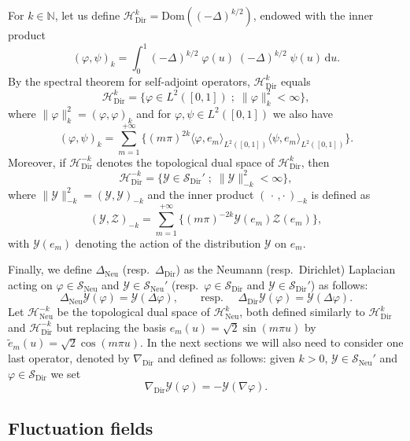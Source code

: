 \documentclass[10pt]{amsart}
\theoremstyle{definition}\newtheorem{defi}[theo]{Definition}\newtheorem{rema}[theo]{Remark}\newtheorem{exam}[theo]{Example}\newtheorem{exem}[theo]{Example}\newtheorem{nota}[theo]{Notation}
\DeclareMathOperator{\Dir}{Dir}
\DeclareMathOperator{\Neu}{Neu}
\newcommand{\mc}[1]{{\mathcal #1}}
\renewcommand{\mc}[1]{{\mathcal #1}}
\newcommand{\SD}{\ensuremath{\mc S_{\Dir}}}
\newcommand{\SN}{\ensuremath{\mc S_{\Neu}}}
\renewcommand{\tilde}{\widetilde}
\newcommand*{\dd}{\mathrm{d}}
\newcommand*{\du}{\dd u}
\begin{document}
For $k\in\mathbb{N}$, let us define ${\mathcal{H}_{\Dir}^k}=\mathrm{Dom}((-\Delta)^{k/2})$, endowed with the inner product
\[
(\varphi,\psi)_k=\int_0^1(-\Delta)^{k/2}\;\varphi(u)\;(-\Delta)^{k/2}\;\psi(u)\, \du.
\]
By the spectral theorem for self-adjoint operators, ${\mathcal{H}_{\Dir}^k}$ equals
\begin{equation*}
{\mathcal{H}_{\Dir}^k} = \Big\{\varphi\in L^2([0,1])\; ;\;
\|\varphi\|_k^2<\infty\Big\},
\end{equation*}
where $\|\varphi\|_k^2=(\varphi,\varphi)_k$ and for $\varphi,\psi\in L^2([0,1])$ we also have
\begin{equation*}
(\varphi,\psi)_k = \sum_{m=1}^{+\infty}\bigg\{(m\pi)^{2k}\langle\varphi,e_m\rangle_{L^2([0,1])}\langle\psi,e_m\rangle_{L^2([0,1])}\bigg\}.
\end{equation*}
Moreover, if ${\mathcal{H}_{\Dir}^{-k}}$ denotes the topological dual space of ${\mathcal{H}_{\Dir}^k}$, then
\[
{\mathcal{H}_{\Dir}^{-k}}= \Big\{\mc Y \in \SD' \; ;\;\|\mc Y\|_{-k}^2<\infty\Big\},
\]
where $\|\mc Y\|_{-k}^2=(\mc Y,\mc Y)_{-k}$ and the inner product $({\,\cdot\,,\cdot\,})_{-k}$ is defined as
\begin{equation}
(\mc Y,\mc Z)_{-k} = \sum_{m=1}^{+\infty}\Big\{(m\pi)^{-2k} \mc Y(e_m)\mc Z(e_m)\Big\}, \label{eq:norm-k}
\end{equation}
with $ \mc Y(e_m)$ denoting the action of the distribution $\mc Y$ on $e_m$.


Finally, we define $\Delta_{\Neu}$ (resp.~$\Delta_{\Dir}$) as the Neumann (resp.~Dirichlet) Laplacian acting on $\varphi\in\SN$ and $\mc Y\in\SN'$ (resp.~$\varphi \in \SD$ and $\mc Y \in \SD'$) as follows:
\[
\Delta_{\Neu} \mc Y(\varphi) = \mc Y(\Delta \varphi), \qquad \text{resp. } \quad \Delta_{\Dir} \mc Y(\varphi) = \mc Y(\Delta \varphi).
\]
Let ${\mathcal{H}_{\Neu}^{-k}}$ be the topological dual space of $\mc H_{\Neu}^k$, both defined similarly to $\mc H_{\Dir}^k$ and ${\mathcal{H}_{\Dir}^{-k}}$ but replacing the basis $e_m(u)=\sqrt{2}\sin(m\pi u)$ by ${\tilde{e}_m(u)}=\sqrt{2}\cos(m\pi u)$. In the next sections we will also need to consider one last operator, denoted by $\nabla_{\Dir}$ and defined as follows: given $k > 0$, $\mc Y \in\SN'$ and $\varphi \in\SD$ we set
\begin{equation}\label{eq:nabladir}
\nabla_{\Dir} \mc Y(\varphi) = - \mc Y(\nabla \varphi).
\end{equation}



\subsection{Fluctuation fields}\label{sec:fields}
\end{document}
